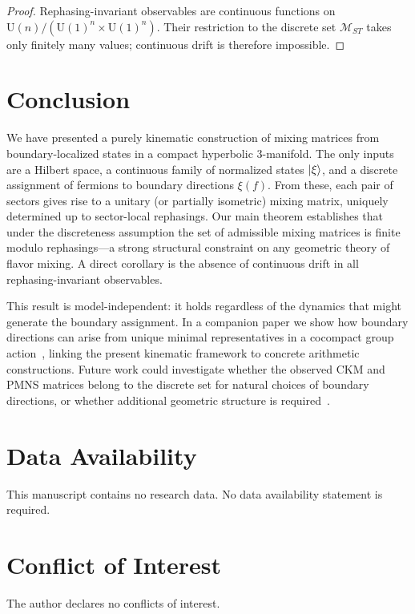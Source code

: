 \documentclass[12pt]{article}
\theoremstyle{definition}
\theoremstyle{remark}
\newcommand{\U}{\mathrm{U}}
\begin{document}
\begin{proof}
Rephasing-invariant observables are continuous functions on
$\U(n)/(\U(1)^n\times\U(1)^n)$.  Their restriction to the discrete set
$\mathcal{M}_{ST}$ takes only finitely many values; continuous drift is
therefore impossible.
\end{proof}

\section{Conclusion}
\label{sec:conclusion}

We have presented a purely kinematic construction of mixing matrices from
boundary-localized states in a compact hyperbolic $3$-manifold.
The only inputs are a Hilbert space, a continuous family of normalized
states $\ket{\xi}$, and a discrete assignment of fermions to boundary
directions $\xi(f)$.
From these, each pair of sectors gives rise to a unitary (or partially
isometric) mixing matrix, uniquely determined up to sector-local rephasings.
Our main theorem establishes that under the discreteness assumption the set
of admissible mixing matrices is finite modulo rephasings---a strong
structural constraint on any geometric theory of flavor mixing.
A direct corollary is the absence of continuous drift in all
rephasing-invariant observables.

This result is model-independent: it holds regardless of the dynamics that
might generate the boundary assignment.  In a companion paper we show how
boundary directions can arise from unique minimal representatives in a
cocompact group action~\cite{bridsonhaefliger,ratcliffe},
linking the present kinematic framework to concrete arithmetic constructions.
Future work could investigate whether the observed CKM and PMNS matrices
belong to the discrete set for natural choices of boundary directions, or
whether additional geometric structure is required~\cite{PDGreview}.

\section*{Data Availability}
This manuscript contains no research data. No data availability statement is required.

\section*{Conflict of Interest}
The author declares no conflicts of interest.
\end{document}

